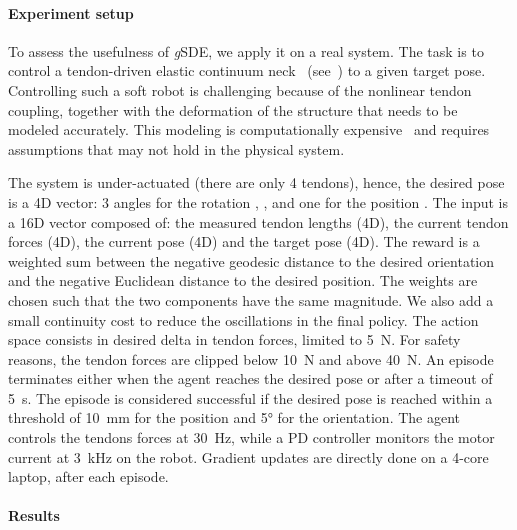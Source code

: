 \documentclass{article}
\newcommand{\qty}{\SI}
\newcommand{\ourSDE}{\textit{g}\textsc{SDE}\xspace}
\begin{document}
\paragraph{Experiment setup}

To assess the usefulness of \ourSDE, we apply it on a real system. The task is to control a tendon-driven elastic continuum neck~\citep{reinecke2016structurally} (see~) to a given target pose. Controlling such a soft robot is challenging because of the nonlinear tendon coupling, together with the deformation of the structure that needs to be modeled accurately. This modeling is computationally expensive~\citep{deutschmann2017position, deutschmann2019six} and requires assumptions that may not hold in the physical system.

The system is under-actuated (there are only 4 tendons), hence, the desired pose is a 4D vector: 3 angles for the rotation , ,  and one for the position . The input is a 16D vector composed of: the measured tendon lengths (4D), the current tendon forces (4D), the current pose (4D) and the target pose (4D). The reward is a weighted sum between the negative geodesic distance to the desired orientation and the negative Euclidean distance to the desired position. The weights are chosen such that the two components have the same magnitude. We also add a small continuity cost to reduce the oscillations in the final policy.
The action space consists in desired delta in tendon forces, limited to \qty{5}{\newton}. For safety reasons, the tendon forces are clipped below \qty{10}{\newton} and above \qty{40}{\newton}.
An episode terminates either when the agent reaches the desired pose or after a timeout of \qty{5}{\second}.
The episode is considered successful if the desired pose is reached within a threshold of \qty{10}{\mm} for the position and \ang{5} for the orientation.
The agent controls the tendons forces at \qty{30}{\hertz}, while a PD controller monitors the motor current at \qty{3}{\kilo\hertz} on the robot. Gradient updates are directly done on a 4-core laptop, after each episode.

\paragraph{Results}
\end{document}
